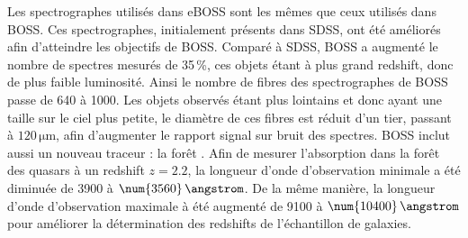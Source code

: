 \documentclass[11pt, twoside, a4paper, openright]{report}
\begin{document}
Les spectrographes utilisés dans eBOSS sont les mêmes que ceux utilisés dans BOSS. Ces spectrographes, initialement présents dans SDSS, ont été améliorés afin d'atteindre les objectifs de BOSS. Comparé à SDSS, BOSS a augmenté le nombre de spectres mesurés de 35\,\%, ces objets étant à plus grand redshift, donc de plus faible luminosité. Ainsi le nombre de fibres des spectrographes de BOSS passe de \num{640} à \num{1000}. Les objets observés étant plus lointains et donc ayant une taille sur le ciel plus petite, le diamètre de ces fibres est réduit d'un tier, passant à $120\,\mathrm{\mu m}$, afin d'augmenter le rapport signal sur bruit des spectres. BOSS inclut aussi un nouveau traceur : la forêt \lya{}. Afin de mesurer l'absorption dans la forêt \lya{} des quasars à un redshift $z=2.2$, la longueur d'onde d'observation minimale a été diminuée de \num{3900} à $\num{3560}\,\angstrom$. De la même manière, la longueur d'onde d'observation maximale à été augmenté de \num{9100} à $\num{10400}\,\angstrom$ pour améliorer la détermination des redshifts de l'échantillon de galaxies.
\end{document}
